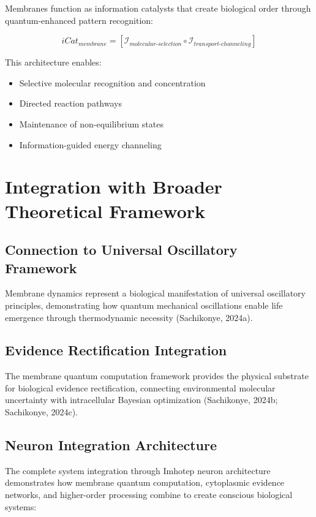 \documentclass[12pt,a4paper]{article}
\begin{document}
Membranes function as information catalysts that create biological order through quantum-enhanced pattern recognition:

\begin{equation}
iCat_{membrane} = [\mathcal{I}_{molecular\text{-}selection} \circ \mathcal{I}_{transport\text{-}channeling}]
\end{equation}

This architecture enables:
\begin{itemize}
\item Selective molecular recognition and concentration
\item Directed reaction pathways
\item Maintenance of non-equilibrium states  
\item Information-guided energy channeling
\end{itemize}

\section{Integration with Broader Theoretical Framework}

\subsection{Connection to Universal Oscillatory Framework}

Membrane dynamics represent a biological manifestation of universal oscillatory principles, demonstrating how quantum mechanical oscillations enable life emergence through thermodynamic necessity (Sachikonye, 2024a).

\subsection{Evidence Rectification Integration}

The membrane quantum computation framework provides the physical substrate for biological evidence rectification, connecting environmental molecular uncertainty with intracellular Bayesian optimization (Sachikonye, 2024b; Sachikonye, 2024c).

\subsection{Neuron Integration Architecture}

The complete system integration through Imhotep neuron architecture demonstrates how membrane quantum computation, cytoplasmic evidence networks, and higher-order processing combine to create conscious biological systems:
\end{document}
